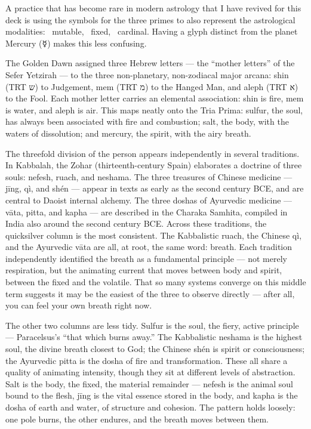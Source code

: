 \documentclass[openright]{book}
\begin{document}
A practice that has become rare in modern astrology that I have revived for this deck is using the symbols for the three primes to also represent the astrological modalities: \textmercury\ mutable, \textsalt\ fixed, \textsulfur\ cardinal. Having a glyph distinct from the planet Mercury ({\symbserif ☿}) makes this less confusing.

The Golden Dawn assigned three Hebrew letters --- the ``mother letters'' of the Sefer Yetzirah --- to the three non-planetary, non-zodiacal major arcana: shin ({\hebrewfont\textdir TRT ש}) to Judgement, mem ({\hebrewfont\textdir TRT מ}) to the Hanged Man, and aleph ({\hebrewfont\textdir TRT א}) to the Fool. Each mother letter carries an elemental association: shin is fire, mem is water, and aleph is air. This maps neatly onto the Tria Prima: sulfur, the soul, has always been associated with fire and combustion; salt, the body, with the waters of dissolution; and mercury, the spirit, with the airy breath.

The threefold division of the person appears independently in several traditions. In Kabbalah, the Zohar (thirteenth-century Spain) elaborates a doctrine of three souls: nefesh, ruach, and neshama. The three treasures of Chinese medicine --- jīng, qì, and shén --- appear in texts as early as the second century BCE, and are central to Daoist internal alchemy. The three doshas of Ayurvedic medicine --- vāta, pitta, and kapha --- are described in the Charaka Samhita, compiled in India also around the second century BCE.
Across these traditions, the quicksilver column is the most consistent. The Kabbalistic ruach, the Chinese qì, and the Ayurvedic vāta are all, at root, the same word: breath. Each tradition independently identified the breath as a fundamental principle --- not merely respiration, but the animating current that moves between body and spirit, between the fixed and the volatile. That so many systems converge on this middle term suggests it may be the easiest of the three to observe directly --- after all, you can feel your own breath right now.

The other two columns are less tidy. Sulfur is the soul, the fiery, active principle --- Paracelsus's ``that which burns away.'' The Kabbalistic neshama is the highest soul, the divine breath closest to God; the Chinese shén is spirit or consciousness; the Ayurvedic pitta is the dosha of fire and transformation. These all share a quality of animating intensity, though they sit at different levels of abstraction. Salt is the body, the fixed, the material remainder --- nefesh is the animal soul bound to the flesh, jīng is the vital essence stored in the body, and kapha is the dosha of earth and water, of structure and cohesion. The pattern holds loosely: one pole burns, the other endures, and the breath moves between them.
\end{document}
